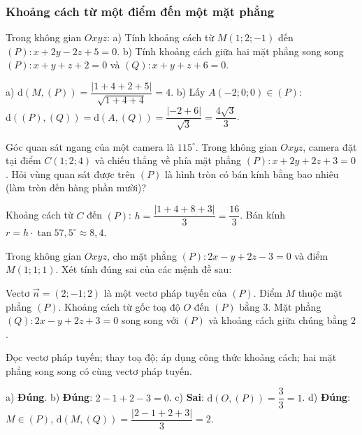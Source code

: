 \subsubsection{Khoảng cách từ một điểm đến một mặt phẳng}
\begin{vidu}
Trong không gian $Oxyz$: a) Tính khoảng cách từ $M(1;2;-1)$ đến $(P)\colon x+2y-2z+5=0$. b) Tính khoảng cách giữa hai mặt phẳng song song $(P)\colon x+y+z+2=0$ và $(Q)\colon x+y+z+6=0$.
\begin{loigiai}
a) $\mathrm d(M,(P))=\dfrac{|1+4+2+5|}{\sqrt{1+4+4}}=4$. b) Lấy $A(-2;0;0)\in(P)$: $\mathrm d((P),(Q))=\mathrm d(A,(Q))=\dfrac{|-2+6|}{\sqrt3}=\dfrac{4\sqrt3}3$.
\end{loigiai}
\end{vidu}

\begin{vidu}
Góc quan sát ngang của một camera là $115^\circ$. Trong không gian $Oxyz$, camera đặt tại điểm $C(1;2;4)$ và chiếu thẳng về phía mặt phẳng $(P)\colon x+2y+2z+3=0$. Hỏi vùng quan sát được trên $(P)$ là hình tròn có bán kính bằng bao nhiêu (làm tròn đến hàng phần mười)?
\begin{loigiai}
Khoảng cách từ $C$ đến $(P)$: $h=\dfrac{|1+4+8+3|}{3}=\dfrac{16}3$. Bán kính $r=h\cdot\tan57{,}5^\circ\approx8{,}4$.
\end{loigiai}
\end{vidu}

\begin{viduds}
Trong không gian $Oxyz$, cho mặt phẳng $(P)\colon2x-y+2z-3=0$ và điểm $M(1;1;1)$. Xét tính đúng sai của các mệnh đề sau:
\begin{dungsai}
  \y Vectơ $\vec n=(2;-1;2)$ là một vectơ pháp tuyến của $(P)$. \oDS
  \y Điểm $M$ thuộc mặt phẳng $(P)$. \oDS
  \y Khoảng cách từ gốc toạ độ $O$ đến $(P)$ bằng $3$. \oDS
  \y Mặt phẳng $(Q)\colon2x-y+2z+3=0$ song song với $(P)$ và khoảng cách giữa chúng bằng $2$. \oDS
\end{dungsai}
\begin{loigiai}
\tuduy Đọc vectơ pháp tuyến; thay toạ độ; áp dụng công thức khoảng cách; hai mặt phẳng song song có cùng vectơ pháp tuyến.

a) \textbf{Đúng}. b) \textbf{Đúng}: $2-1+2-3=0$. c) \textbf{Sai}: $\mathrm d(O,(P))=\dfrac33=1$. d) \textbf{Đúng}: $M\in(P)$, $\mathrm d(M,(Q))=\dfrac{|2-1+2+3|}3=2$.
\end{loigiai}
\end{viduds}
